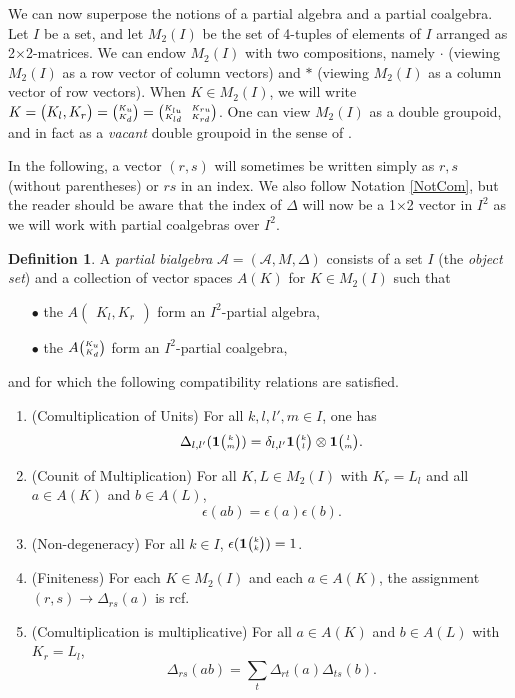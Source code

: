 \documentclass[10pt]{article}
\newcommand{\Grs}[3]{#1{\begin{pmatrix} #2,  #3\end{pmatrix}}}
\newcommand{\Grt}[3]{#1{\tiny{\begin{pmatrix} #2\\#3\end{pmatrix}}}}
\newcommand{\UnitC}[2]{\Grt{\mathbf{1}}{#1}{#2}}
\newcommand{\eGr}[5]{#1{{\tiny \begin{pmatrix} #2 \quad #3 \\ #4 \quad #5\end{pmatrix}}}}
\theoremstyle{definition}
\newtheorem{Def}[Theorem]{Definition}
\numberwithin{equation}{section}
\begin{document}
We can now superpose the notions of a partial algebra and a partial coalgebra. Let $I$ be a set, and let $M_2(I)$ be the set of 4-tuples of elements of $I$ arranged as 2$\times$2-matrices. We can endow $M_2(I)$ with two compositions, namely $\cdot$ (viewing $M_2(I)$ as a row vector of column vectors) and $*$ (viewing $M_2(I)$ as a column vector of row vectors). When $K\in M_2(I)$, we will write $K = \Grs{}{K_l}{K_r} = \Grt{}{K_u}{K_d} = \eGr{}{K_{lu}}{K_{ru}}{K_{ld}}{K_{rd}}$. One can view $M_2(I)$ as a double groupoid, and in fact as a \emph{vacant} double groupoid in the sense of \cite{AN1}. 

In the following, a vector $(r,s)$ will sometimes be written simply as $r,s$ (without parentheses) or $rs$ in an index. We also follow Notation \ref{NotCom}, but the reader should be aware that the index of $\Delta$ will now be a 1$\times$2 vector in $I^2$ as we will work with partial coalgebras over $I^2$.

\begin{Def}\label{DefPartBiAlg} A \emph{partial bialgebra} $\mathscr{A}=(\mathscr{A},M,\Delta)$ consists of a set $I$ (the \emph{object set}) and a collection of vector spaces $A(K)$ for $K\in M_2(I)$ such that 
\begin{itemize}
\item[$\bullet$] the $\Grs{A}{K_l}{K_r}$ form an $I^2$-partial algebra,
\item[$\bullet$] the $\Grt{A}{K_u}{K_d}$ form an $I^2$-partial coalgebra,
\end{itemize} 
and for which the following compatibility relations are satisfied.
\begin{enumerate}[label=(\arabic*)]
\item\label{Propa} (Comultiplication of Units) For all $k,l,l',m\in I$, one has 
\[\Delta_{l,l'}(\UnitC{k}{m}) = \delta_{l,l'} \UnitC{k}{l}\otimes \UnitC{l}{m}.\]  
\item\label{Propb} (Counit of Multiplication) For all $K,L\in M_2(I)$ with $K_r = L_l$ and all $a\in A(K)$ and $b\in A(L)$, \[\epsilon(ab) = \epsilon(a)\epsilon(b).\]%
\item\label{Propc} (Non-degeneracy) For all $k\in I$, $\epsilon(\UnitC{k}{k})=1$. 
\item\label{Propd} (Finiteness) For each $K\in M_2(I)$ and each $a\in A(K)$, the assignment $(r,s)\rightarrow \Delta_{rs}(a)$ is rcf.
\item\label{Prope} (Comultiplication is multiplicative) For all $a\in A(K)$ and $b\in A(L)$ with $K_r= L_l$,  \[\Delta_{rs}(ab) = \sum_t \Delta_{rt}(a)\Delta_{ts}(b).\]
\end{enumerate}
\end{Def}
\end{document}
